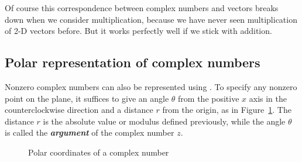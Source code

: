 

Of course this correspondence between complex numbers and vectors breaks down when we consider multiplication, because we have never seen multiplication of 2-D vectors before. But it works perfectly well if we stick with addition.

\subsection{Polar representation of complex numbers}

Nonzero complex numbers can also be represented using . To specify any nonzero point on the plane, it suffices
to give an angle $\theta$ from the positive $x$ axis in the counterclockwise
direction and a distance $r$ from the origin, as in Figure~\ref{polarcoord}.
The distance  $r$ is the absolute value or modulus defined previously, while the angle $\theta$ is called the {\bf \emph{argument}} of the complex number $z$.
\begin{figure}[htb]
\begin{center}

\end{center}
\caption{Polar coordinates of a complex number}
\label{polarcoord}
\end{figure}


